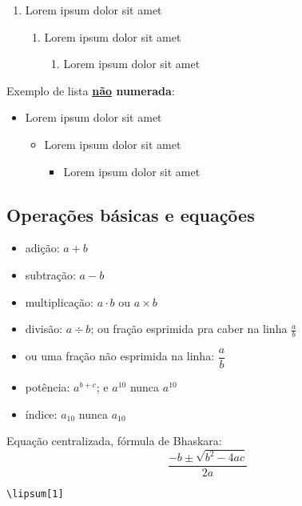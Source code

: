 \documentclass[a4paper, 12pt]{article}
\begin{document}
\begin{enumerate}[left=15mm..20mm]
	\item Lorem ipsum dolor sit amet
	\begin{enumerate}
		\item Lorem ipsum dolor sit amet
		\begin{enumerate}
			\item Lorem ipsum dolor sit amet
		\end{enumerate}
	\end{enumerate}
\end{enumerate}

Exemplo de lista \textbf{\underline{não} numerada}:

\begin{itemize}[left=15mm..20mm]
	\item Lorem ipsum dolor sit amet
	\begin{itemize}
		\item Lorem ipsum dolor sit amet
		\begin{itemize}
			\item Lorem ipsum dolor sit amet
		\end{itemize}
	\end{itemize}
\end{itemize}

\subsection{Operações básicas e equações}

\begin{itemize}[left=15mm..20mm]
	\item adição: $a+b$
	\item subtração: $a-b$
	\item multiplicação: $a \cdot b$ ou $a \times b$
	\item divisão: $a\div b$; ou fração esprimida pra caber na linha $\frac{a}{b}$
	\item ou uma fração não esprimida na linha: $\dfrac{a}{b}$
	\item potência: $a^{b+c}$; e $a^{10}$ nunca $a^10$
	\item índice: $a_{10}$ nunca $a_10$
\end{itemize}

Equação centralizada, fórmula de Bhaskara: $$\frac{-b \pm \sqrt{b^2 - 4ac}}{2a}$$

\verb|\lipsum[1]|

\vspace{5mm}
\end{document}
